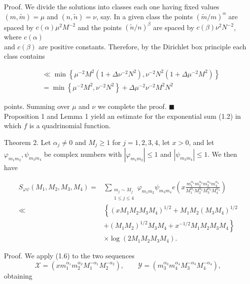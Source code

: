 \documentclass[10pt]{article}
\begin{document}
Proof. We divide the solutions into classes each one having fixed values $(m, \tilde{m})=\mu$ and $(n, \tilde{n})=\nu$, say. In a given class the points $(\tilde{m} / m)^{\alpha}$ are spaced by $c(\alpha) \mu^{2} M^{-2}$ and the points $(\tilde{n} / n)^{\beta}$ are spaced by $c(\beta) \nu^{2} N^{-2}$, where $c(\alpha)$\\
and $c(\beta)$ are positive constants. Therefore, by the Dirichlet box principle each class contains

$$
\begin{aligned}
& \ll \min \left\{\mu^{-2} M^{2}\left(1+\Delta \nu^{-2} N^{2}\right), \nu^{-2} N^{2}\left(1+\Delta \mu^{-2} M^{2}\right)\right\} \\
& =\min \left\{\mu^{-2} M^{2}, \nu^{-2} N^{2}\right\}+\Delta \mu^{-2} \nu^{-2} M^{2} N^{2}
\end{aligned}
$$

points. Summing over $\mu$ and $\nu$ we complete the proof. \(\blacksquare\)\\
Proposition 1 and Lemma 1 yield an estimate for the exponential sum (1.2) in which $f$ is a quadrinomial function.

Theorem 2. Let $\alpha_{j} \neq 0$ and $M_{j} \geqslant 1$ for $j=1,2,3,4$, let $x>0$, and let $\varphi_{m_{1}m_{2}}, \psi_{m_{3}m_{4}}$ be complex numbers with $\left|\varphi_{m_{1}m_{2}}\right| \leqslant 1$ and $\left|\psi_{m_{3}m_{4}}\right| \leqslant 1$. We then have

$$
\begin{aligned}
S_{\varphi \psi}\left(M_{1}, M_{2}, M_{3}, M_{4}\right)= & \sum_{\substack{m_{j} \sim M_{j}\\1\leqslant j\leqslant4}} \varphi_{m_{1}m_{2}} \psi_{m_{3}m_{4}} e\left(x \frac{m_{1}^{\alpha_{1}} m_{2}^{\alpha_{2}} m_{3}^{\alpha_{3}} m_{4}^{\alpha_{4}}}{M_{1}^{\alpha_{1}} M_{2}^{\alpha_{2}} M_{3}^{\alpha_{3}} M_{4}^{\alpha_{4}}}\right) \\
\ll & \left\{\left(x M_{1} M_{2} M_{3} M_{4}\right)^{1 / 2}+M_{1} M_{2}\left(M_{3} M_{4}\right)^{1 / 2}\right. \\
& \left.+\left(M_{1} M_{2}\right)^{1 / 2} M_{3} M_{4}+x^{-1 / 2} M_{1} M_{2} M_{3} M_{4}\right\} \\
& \times \log\left(2 M_{1} M_{2} M_{3} M_{4}\right) .
\end{aligned}
$$

Proof. We apply (1.6) to the two sequences
\[
\mathscr{X}=\left(x m_{1}^{\alpha_{1}} m_{2}^{\alpha_{2}} M_{1}^{-\alpha_{1}} M_{2}^{-\alpha_{2}}\right),
\qquad
\mathscr{Y}=\left(m_{3}^{\alpha_{3}} m_{4}^{\alpha_{4}} M_{3}^{-\alpha_{3}} M_{4}^{-\alpha_{4}}\right),
\]
obtaining
\end{document}
